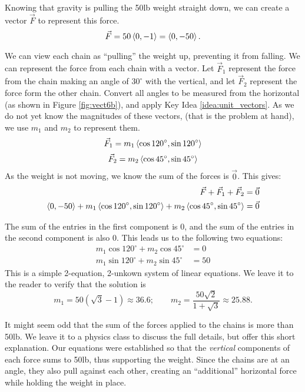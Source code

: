 {Knowing that gravity is pulling the 50lb weight straight down, we can create a vector $\vec F$ to represent this force. 
$$\vec F = 50\left\langle 0,-1\right\rangle = \left\langle 0,-50\right\rangle.$$

We can view each chain as ``pulling'' the weight up, preventing it from falling. We can represent the force from each chain with a vector. Let $\vec F_1$ represent the force from the chain making an angle of $30^\circ$ with the vertical, and let $\vec F_2$ represent the force form the other chain. Convert all angles to be measured from the horizontal (as shown in Figure \ref{fig:vect6b}), and apply Key Idea \ref{idea:unit_vectors}. As we do not yet know the magnitudes of these vectors, (that is the problem at hand), we use $m_1$ and $m_2$ to represent them.
$$\vec F_1 = m_1\left\langle \cos 120^\circ,\sin120^\circ\right\rangle$$
$$\vec F_2 = m_2\left\langle \cos 45^\circ,\sin45^\circ\right\rangle$$
As the weight is not moving, we know the sum of the forces is $\vec 0$. This gives:
\begin{align*}
\vec F + \vec F_1 + \vec F_2 & = \vec 0\\
\left\langle 0,-50\right\rangle + m_1\left\langle \cos 120^\circ,\sin120^\circ\right\rangle + m_2\left\langle \cos 45^\circ,\sin45^\circ\right\rangle &=\vec 0
\end{align*}

The sum of the entries in the first component is 0, and the sum of the entries in the second component is also 0. This leads us to the following two equations:
\begin{align*}
m_1\cos120^\circ + m_2\cos45^\circ &=0 \\
m_1\sin120^\circ + m_2\sin45^\circ &=50
\end{align*}
This is a simple 2-equation, 2-unkown system of linear equations. We leave it to the reader to verify that the solution is 
$$m_1=50(\sqrt{3}-1) \approx 36.6;\qquad m_2=\frac{50\sqrt{2}}{1+\sqrt{3}} \approx 25.88.$$

It might seem odd that the sum of the forces applied to the chains is more than 50lb. We leave it to a physics class to discuss the full details, but offer this short explanation. Our equations were established so that the \textit{vertical} components of each force sums to 50lb, thus supporting the weight. Since the chains are at an angle, they also pull against each other, creating an ``additional'' horizontal force while holding the weight in place.
}\\

